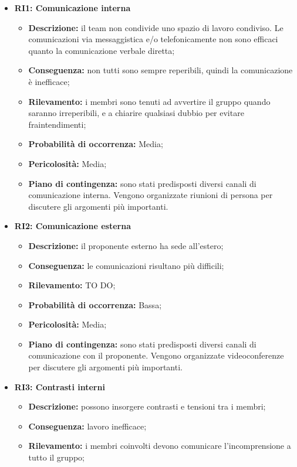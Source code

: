 \begin{itemize}
\begin{itemize}
	\end{itemize}
	\item \textbf{RI1: Comunicazione interna}
	\begin{itemize}
		\item \textbf{Descrizione:} il team non condivide uno spazio di lavoro condiviso. Le comunicazioni via messaggistica e/o telefonicamente non sono efficaci quanto la comunicazione verbale diretta;
		\item \textbf{Conseguenza:} non tutti sono sempre reperibili, quindi la comunicazione è inefficace;
		\item \textbf{Rilevamento:} i membri sono tenuti ad avvertire il gruppo quando saranno irreperibili, e a chiarire qualsiasi dubbio per evitare fraintendimenti;
		\item \textbf{Probabilità di occorrenza:} Media;
		\item \textbf{Pericolosità:} Media;
		\item \textbf{Piano di contingenza:} sono stati predisposti diversi canali di comunicazione interna. Vengono organizzate riunioni di persona per discutere gli argomenti più importanti. %
	\end{itemize}
	\item \textbf{RI2: Comunicazione esterna}
	\begin{itemize}
		\item \textbf{Descrizione:} il proponente esterno ha sede all'estero;
		\item \textbf{Conseguenza:} le comunicazioni risultano più difficili;
		\item \textbf{Rilevamento:} TO DO;
		\item \textbf{Probabilità di occorrenza:} Bassa;
		\item \textbf{Pericolosità:} Media;
		\item \textbf{Piano di contingenza:} sono stati predisposti diversi canali di comunicazione con il proponente. Vengono organizzate videoconferenze per discutere gli argomenti più importanti.
	\end{itemize}
	\item \textbf{RI3: Contrasti interni}
	\begin{itemize}
		\item \textbf{Descrizione:} possono insorgere contrasti e tensioni tra i membri;
		\item \textbf{Conseguenza:} lavoro inefficace;
		\item \textbf{Rilevamento:} i membri coinvolti devono comunicare l'incomprensione a tutto il gruppo;

\end{itemize}
\end{itemize}
